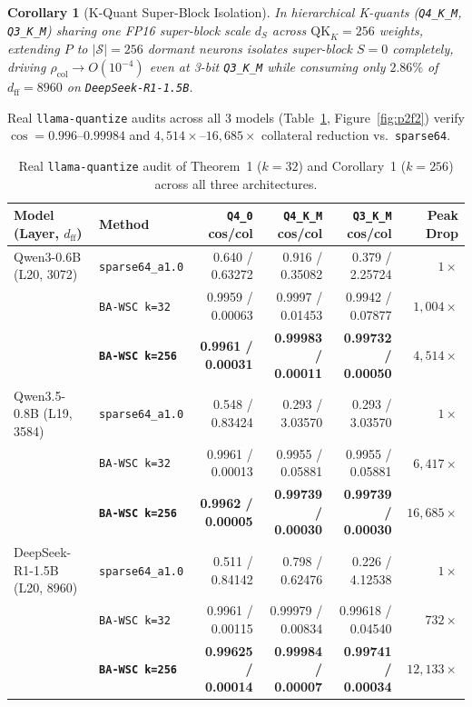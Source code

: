 \documentclass[11pt,letterpaper]{article}
\newtheorem{corollary}{Corollary}
\begin{document}
\begin{corollary}[K-Quant Super-Block Isolation]
In hierarchical K-quants (\texttt{Q4\_K\_M}, \texttt{Q3\_K\_M}) sharing one FP16 super-block scale $d_S$ across $\mathrm{QK}_K=256$ weights, extending $P$ to $|\mathcal{S}|=256$ dormant neurons isolates super-block $S=0$ completely, driving $\rho_{\text{col}} \to O(10^{-4})$ even at 3-bit \texttt{Q3\_K\_M} while consuming only $2.86\%$ of $d_{\text{ff}}=8960$ on \texttt{DeepSeek-R1-1.5B}.
\end{corollary}

Real \texttt{llama-quantize} audits across all 3 models (Table~\ref{tab:p2audit}, Figure~\ref{fig:p2f2}) verify $\cos=0.996\text{--}0.99984$ and $4{,}514\times$--$16{,}685\times$ collateral reduction vs.\ \texttt{sparse64}.

\begin{table}[t]
\centering
\caption{Real \texttt{llama-quantize} audit of Theorem~1 ($k=32$) and Corollary~1 ($k=256$) across all three architectures.}
\label{tab:p2audit}
\scriptsize
\begin{tabular}{llrrrr}
\toprule
Model (Layer, $d_{\text{ff}}$) & Method & \texttt{Q4\_0} cos/col & \texttt{Q4\_K\_M} cos/col & \texttt{Q3\_K\_M} cos/col & Peak Drop \\
\midrule
Qwen3-0.6B (L20, 3072) & \texttt{sparse64\_a1.0} & 0.640 / 0.63272 & 0.916 / 0.35082 & 0.379 / 2.25724 & $1\times$ \\
& \texttt{BA-WSC k=32} & 0.9959 / 0.00063 & 0.9997 / 0.01453 & 0.9942 / 0.07877 & $1{,}004\times$ \\
& \textbf{\texttt{BA-WSC k=256}} & \textbf{0.9961 / 0.00031} & \textbf{0.99983 / 0.00011} & \textbf{0.99732 / 0.00050} & \textbf{$4{,}514\times$} \\
\midrule
Qwen3.5-0.8B (L19, 3584) & \texttt{sparse64\_a1.0} & 0.548 / 0.83424 & 0.293 / 3.03570 & 0.293 / 3.03570 & $1\times$ \\
& \texttt{BA-WSC k=32} & 0.9961 / 0.00013 & 0.9955 / 0.05881 & 0.9955 / 0.05881 & $6{,}417\times$ \\
& \textbf{\texttt{BA-WSC k=256}} & \textbf{0.9962 / 0.00005} & \textbf{0.99739 / 0.00030} & \textbf{0.99739 / 0.00030} & \textbf{$16{,}685\times$} \\
\midrule
DeepSeek-R1-1.5B (L20, 8960) & \texttt{sparse64\_a1.0} & 0.511 / 0.84142 & 0.798 / 0.62476 & 0.226 / 4.12538 & $1\times$ \\
& \texttt{BA-WSC k=32} & 0.9961 / 0.00115 & 0.99979 / 0.00834 & 0.99618 / 0.04540 & $732\times$ \\
& \textbf{\texttt{BA-WSC k=256}} & \textbf{0.99625 / 0.00014} & \textbf{0.99984 / 0.00007} & \textbf{0.99741 / 0.00034} & \textbf{$12{,}133\times$} \\
\bottomrule
\end{tabular}
\end{table}
\end{document}
